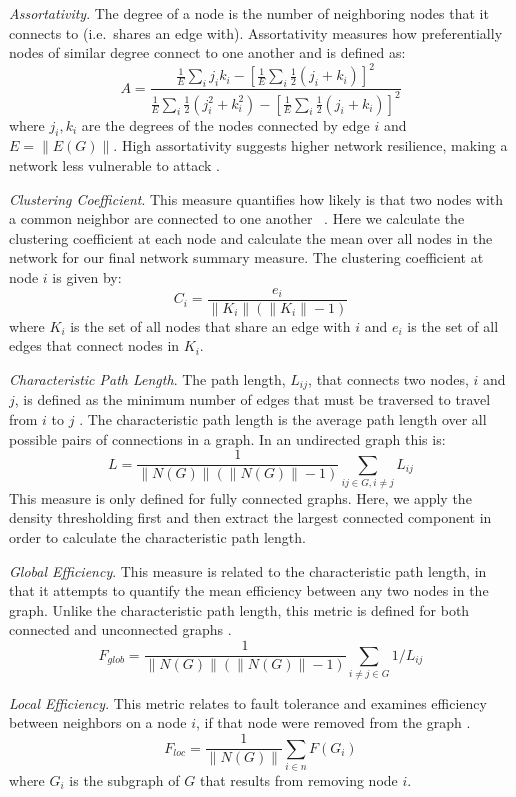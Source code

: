 \documentclass{frontiersSCNS} %
\begin{document}
\emph{Assortativity}. The degree of a node is the number of neighboring nodes that it connects to (i.e.\ shares an edge with). Assortativity measures how preferentially nodes of similar degree connect to one another \citep{Newman2006a} and is defined as:
$$A =  \frac{ \frac{1}{E} \sum_{i}{j_i k_i} - [ \frac{1}{E} \sum_{i}{ \frac{1}{2} (j_i + k_i)} ]^2 }{ \frac{1}{E} \sum_{i}{ \frac{1}{2}( j_{i}^{2} + k_{i}^{2} ) } - [ \frac{1}{E} \sum_{i}{ \frac{1}{2} (j_i + k_i)} ]^2  } $$
where $j_i,k_i$ are the degrees of the nodes connected by edge $i$ and $E = \|E(G)\|$. High assortativity suggests higher network resilience, making a network less vulnerable to attack \citep{Newman2002}.

\emph{Clustering Coefficient}. This measure quantifies how likely is that two nodes with a common neighbor are connected to one another ~\citep{Watts1998}. Here we calculate the clustering coefficient at each node and calculate the mean over all nodes in the network for our final network summary measure. The clustering coefficient at node $i$ is given by:
$$C_i = \frac{e_i}{\|K_i\| ( \|K_i\| -1 )}$$
where $K_i$ is the set of all nodes that share an edge with $i$ and $e_i$ is the set of all edges that connect nodes in $K_i$.

\emph{Characteristic Path Length}. The path length, $L_{ij}$, that connects two nodes, $i$ and $j$, is defined as the minimum number of edges that must be traversed to travel from $i$ to $j$ \citep{Dijkstra1959}. The characteristic path length is the average path length over all possible pairs of connections in a graph. In an undirected graph this is:
$$L = \frac{1}{\|N(G)\|(\|N(G)\|-1)} \sum_{ij \in G, i \neq j}{L_{ij}}$$
This measure is only defined for fully connected graphs. Here, we apply the density thresholding first and then extract the largest connected component in order to calculate the characteristic path length.

\emph{Global Efficiency}. This measure is related to the
characteristic path length, in that it attempts to quantify the mean
efficiency between any two nodes in the graph. Unlike the
characteristic path length, this metric is defined for both connected and unconnected graphs \citep{Latora2001}.
$$F_{glob} = \frac{1}{\|N(G)\|(\|N(G)\|-1)} \sum_{i \neq j \in G}{1/L_{ij}}$$

\emph{Local Efficiency}. This metric relates to fault tolerance and examines efficiency between neighbors on a node $i$, if that node were removed from the graph \citep{Latora2001}.
$$F_{loc} = \frac{1}{\|N(G)\|} \sum_{i \in n}{F(G_i)}$$
where $G_i$ is the subgraph of $G$ that results from removing node $i$.
\end{document}
